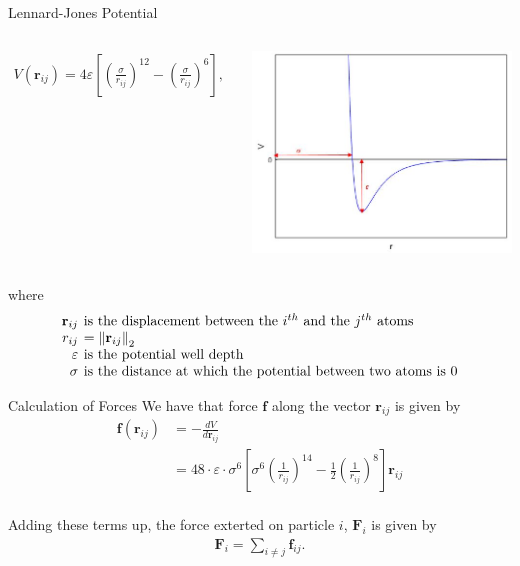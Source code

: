 \documentclass{beamer}
\renewcommand{\vec}[1]{\mathbf{#1}}
\begin{document}
\begin{frame}{Lennard-Jones Potential}
\begin{columns}
	\begin{align*}
		V\left(\vec{r}_{ij}\right) = 4\varepsilon \left[ \left( \frac{\sigma}{r_{ij}}\right)^{12} - \left( \frac{\sigma}{r_{ij}}\right)^{6} \right],
	\end{align*}

	\centering
	\includegraphics[scale=0.40]{lennard-jones_potential_graph}
\end{columns}
where
$$
\arraycolsep=2pt
\begin{array}{rl}
	\vec{r}_{ij} &\mbox{is the displacement between the $i^{th}$ and the $j^{th}$ atoms} \\
	r_{ij} &= \left\Vert\vec{r}_{ij}\right\Vert_{2} \\
	\varepsilon & \mbox{is the potential well depth} \\
	\sigma & \mbox{is the distance at which the potential between two atoms is 0}
\end{array}
$$
\end{frame}

\begin{frame}{Calculation of Forces}
We have that force $\vec{f}$ along the vector $\vec{r}_{ij}$ is given by
\begin{align*}
\vec{f}\left(\vec{r}_{ij}\right) &= -\frac{dV}{d\vec{r}_{ij}} \\
&=48\cdot \varepsilon \cdot \sigma^{6}\left[ \sigma^{6}\left( \frac{1}{r_{ij}}\right)^{14} - \frac{1}{2}\left( \frac{1}{r_{ij}}\right)^{8}\right]\vec{r}_{ij}
\end{align*} \\
\medskip
Adding these terms up, the force exterted on particle $i$, $\vec{F}_{i}$ is given by
\begin{align*}
	\vec{F}_{i} = \sum_{i \neq j} \vec{f}_{ij}.
\end{align*}
\end{frame}
\end{document}
